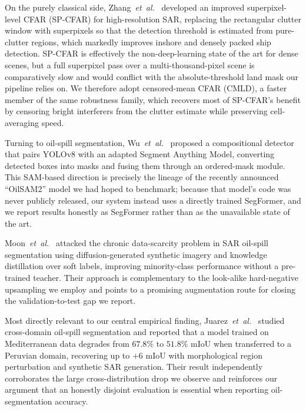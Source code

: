 \documentclass[a4paper,11pt]{article}
\begin{document}
On the purely classical side, Zhang~\textit{et~al.}~\cite{zhang2023spcfar} developed an
improved superpixel-level CFAR (SP-CFAR) for high-resolution SAR, replacing the
rectangular clutter window with superpixels so that the detection threshold is
estimated from pure-clutter regions, which markedly improves inshore and densely packed
ship detection. SP-CFAR is effectively the non-deep-learning state of the art for dense
scenes, but a full superpixel pass over a multi-thousand-pixel scene is comparatively
slow and would conflict with the absolute-threshold land mask our pipeline relies on.
We therefore adopt censored-mean CFAR (CMLD), a faster member of the same robustness
family, which recovers most of SP-CFAR's benefit by censoring bright interferers from
the clutter estimate while preserving cell-averaging speed.

Turning to oil-spill segmentation, Wu~\textit{et~al.}~\cite{wu2024compositional}
proposed a compositional detector that pairs YOLOv8 with an adapted Segment Anything
Model, converting detected boxes into masks and fusing them through an ordered-mask
module. This SAM-based direction is precisely the lineage of the recently announced
``OilSAM2'' model we had hoped to benchmark; because that model's code was never
publicly released, our system instead uses a directly trained SegFormer, and we report
results honestly as SegFormer rather than as the unavailable state of the art.

Moon~\textit{et~al.}~\cite{moon2024diffusion} attacked the chronic data-scarcity
problem in SAR oil-spill segmentation using diffusion-generated synthetic imagery and
knowledge distillation over soft labels, improving minority-class performance without a
pre-trained teacher. Their approach is complementary to the look-alike hard-negative
upsampling we employ and points to a promising augmentation route for closing the
validation-to-test gap we report.

Most directly relevant to our central empirical finding,
Juarez~\textit{et~al.}~\cite{juarez2025crossdomain} studied cross-domain oil-spill
segmentation and reported that a model trained on Mediterranean data degrades from
$67.8\%$ to $51.8\%$ mIoU when transferred to a Peruvian domain, recovering up to
$+6$ mIoU with morphological region perturbation and synthetic SAR generation. Their
result independently corroborates the large cross-distribution drop we observe and
reinforces our argument that an honestly disjoint evaluation is essential when
reporting oil-segmentation accuracy.
\end{document}

